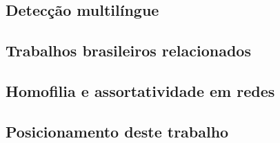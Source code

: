 \subsection{Detec\c{c}\~ao multil\'ingue}
\label{sec:multilingue}

\subsection{Trabalhos brasileiros relacionados}
\label{sec:trabalhos_br}

\subsection{Homofilia e assortatividade em redes}
\label{sec:homofilia}

%

\subsection{Posicionamento deste trabalho}
\label{sec:posicionamento}

%
